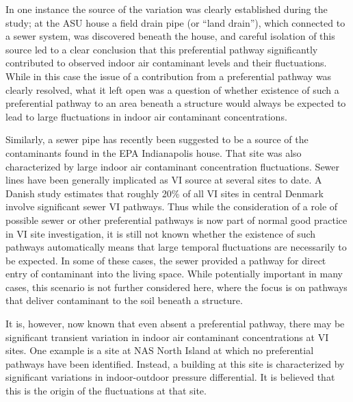 \documentclass[journal=esthag,manuscript=article]{achemso}
\begin{document}
In one instance the source of the variation was clearly established during the study; at the ASU house a field drain pipe (or “land drain”), which connected to a sewer system, was discovered beneath the house, and careful isolation of this source led to a clear conclusion that this preferential pathway significantly contributed to observed indoor air contaminant levels and their fluctuations\cite{guo_vapor_2015,guo_identification_2015}.
While in this case the issue of a contribution from a preferential pathway was clearly resolved, what it left open was a question of whether existence of such a preferential pathway to an area beneath a structure would always be expected to lead to large fluctuations in indoor air contaminant concentrations. \par

Similarly, a sewer pipe has recently been suggested to be a source of the contaminants found in the EPA Indianapolis house\cite{mchugh_evidence_2017}.
That site was also characterized by large indoor air contaminant concentration fluctuations.
Sewer lines have been generally implicated as VI source at several sites to date\cite{pennell_sewer_2013,mchugh_evidence_2017,roghani_occurrence_2018,riis_vapor_2010}.
A Danish study estimates that roughly 20\% of all VI sites in central Denmark involve significant sewer VI pathways\cite{nielsen_remediation_2017}.
Thus while the consideration of a role of possible sewer or other preferential pathways is now part of normal good practice in VI site investigation, it is still not known whether the existence of such pathways automatically means that large temporal fluctuations are necessarily to be expected.
In some of these cases\cite{pennell_sewer_2013,riis_vapor_2010}, the sewer provided a pathway for direct entry of contaminant into the living space.
While potentially important in many cases, this scenario is not further considered here, where the focus is on pathways that deliver contaminant to the soil beneath a structure. \par

It is, however, now known that even absent a preferential pathway, there may be significant transient variation in indoor air contaminant concentrations at VI sites\cite{folkes_observed_2009,brenner_results_2010,johnston_spatiotemporal_2014}.
One example is a site at NAS North Island at which no preferential pathways have been identified.
Instead, a building at this site is characterized by significant variations in indoor-outdoor pressure differential\cite{hosangadi_high-frequency_2017}.
It is believed that this is the origin of the fluctuations at that site. \par
\end{document}
